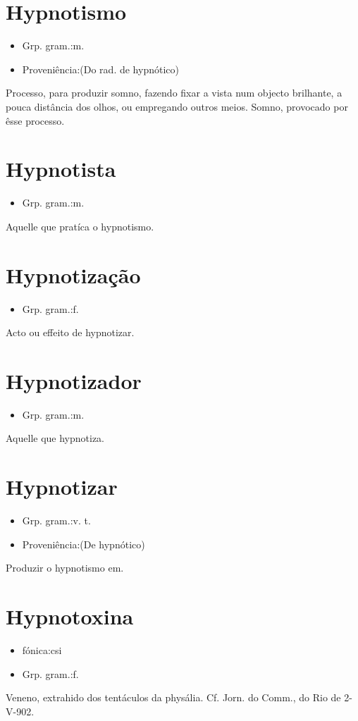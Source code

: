 \documentclass{article}
\begin{document}
\section{Hypnotismo}
\begin{itemize}
\item {Grp. gram.:m.}
\end{itemize}
\begin{itemize}
\item {Proveniência:(Do rad. de \textunderscore hypnótico\textunderscore )}
\end{itemize}
Processo, para produzir somno, fazendo fixar a vista num objecto brilhante, a pouca distância dos olhos, ou empregando outros meios.
Somno, provocado por êsse processo.
\section{Hypnotista}
\begin{itemize}
\item {Grp. gram.:m.}
\end{itemize}
Aquelle que pratíca o hypnotismo.
\section{Hypnotização}
\begin{itemize}
\item {Grp. gram.:f.}
\end{itemize}
Acto ou effeito de hypnotizar.
\section{Hypnotizador}
\begin{itemize}
\item {Grp. gram.:m.}
\end{itemize}
Aquelle que hypnotiza.
\section{Hypnotizar}
\begin{itemize}
\item {Grp. gram.:v. t.}
\end{itemize}
\begin{itemize}
\item {Proveniência:(De \textunderscore hypnótico\textunderscore )}
\end{itemize}
Produzir o hypnotismo em.
\section{Hypnotoxina}
\begin{itemize}
\item {fónica:csi}
\end{itemize}
\begin{itemize}
\item {Grp. gram.:f.}
\end{itemize}
Veneno, extrahido dos tentáculos da physália. Cf. \textunderscore Jorn. do Comm.\textunderscore , do Rio de 2-V-902.
\end{document}
